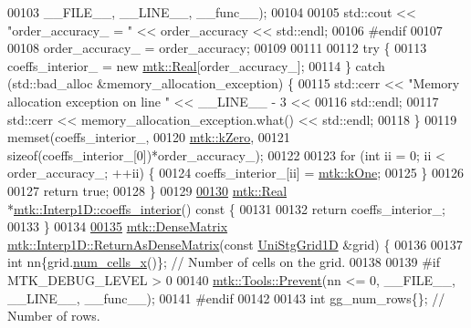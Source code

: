 \begin{DoxyCode}
00103                       \_\_FILE\_\_, \_\_LINE\_\_, \_\_func\_\_);
00104 
00105   std::cout << \textcolor{stringliteral}{"order\_accuracy\_ = "} << order\_accuracy << std::endl;
00106 \textcolor{preprocessor}{  #endif}
00107 
00108   order\_accuracy\_ = order\_accuracy;
00109 
00111 
00112   \textcolor{keywordflow}{try} \{
00113     coeffs\_interior\_ = \textcolor{keyword}{new} \hyperlink{group__c01-roots_gac080bbbf5cbb5502c9f00405f894857d}{mtk::Real}[order\_accuracy\_];
00114   \} \textcolor{keywordflow}{catch} (std::bad\_alloc &memory\_allocation\_exception) \{
00115     std::cerr << \textcolor{stringliteral}{"Memory allocation exception on line "} << \_\_LINE\_\_ - 3 <<
00116       std::endl;
00117     std::cerr << memory\_allocation\_exception.what() << std::endl;
00118   \}
00119   memset(coeffs\_interior\_,
00120          \hyperlink{group__c01-roots_ga59a451a5fae30d59649bcda274fea271}{mtk::kZero},
00121          \textcolor{keyword}{sizeof}(coeffs\_interior\_[0])*order\_accuracy\_);
00122 
00123   \textcolor{keywordflow}{for} (\textcolor{keywordtype}{int} ii = 0; ii < order\_accuracy\_; ++ii) \{
00124     coeffs\_interior\_[ii] = \hyperlink{group__c01-roots_ga26407c24d43b6b95480943340d285c71}{mtk::kOne};
00125   \}
00126 
00127   \textcolor{keywordflow}{return} \textcolor{keyword}{true};
00128 \}
00129 
\hypertarget{mtk__interp__1d_8cc_source_l00130}{}\hyperlink{classmtk_1_1Interp1D_a652289cbb0000d3f4e5e8d632aaf4b03}{00130} \hyperlink{group__c01-roots_gac080bbbf5cbb5502c9f00405f894857d}{mtk::Real} *\hyperlink{classmtk_1_1Interp1D_a652289cbb0000d3f4e5e8d632aaf4b03}{mtk::Interp1D::coeffs\_interior}()\textcolor{keyword}{ const }\{
00131 
00132   \textcolor{keywordflow}{return} coeffs\_interior\_;
00133 \}
00134 
\hypertarget{mtk__interp__1d_8cc_source_l00135}{}\hyperlink{classmtk_1_1Interp1D_a62b241a3db626e92e9e57c7da772a36b}{00135} \hyperlink{classmtk_1_1DenseMatrix}{mtk::DenseMatrix} \hyperlink{classmtk_1_1Interp1D_a62b241a3db626e92e9e57c7da772a36b}{mtk::Interp1D::ReturnAsDenseMatrix}(\textcolor{keyword}{const}
       \hyperlink{classmtk_1_1UniStgGrid1D}{UniStgGrid1D} &grid) \{
00136 
00137   \textcolor{keywordtype}{int} nn\{grid.\hyperlink{classmtk_1_1UniStgGrid1D_af1b3729d8afa07be5b2775ed68015b80}{num\_cells\_x}()\}; \textcolor{comment}{// Number of cells on the grid.}
00138 
00139 \textcolor{preprocessor}{  #if MTK\_DEBUG\_LEVEL > 0}
00140   \hyperlink{classmtk_1_1Tools_afe5bb096309258e2e72503fd7b41c7e0}{mtk::Tools::Prevent}(nn <= 0, \_\_FILE\_\_, \_\_LINE\_\_, \_\_func\_\_);
00141 \textcolor{preprocessor}{  #endif}
00142 
00143   \textcolor{keywordtype}{int} gg\_num\_rows\{\};  \textcolor{comment}{// Number of rows.}

\end{DoxyCode}
